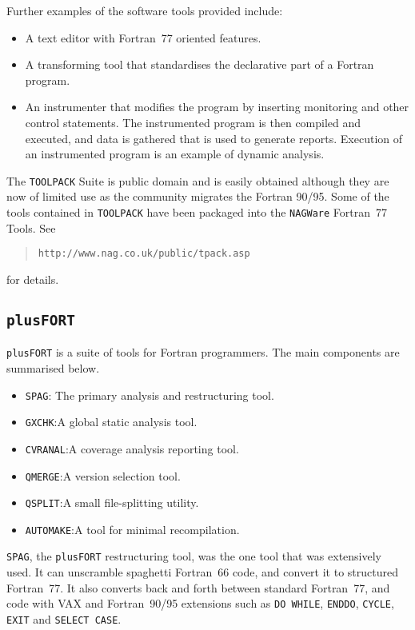 \documentclass[a4paper,titlepage,11pt]{article}
\begin{document}
Further examples of the software tools provided include:
\begin{itemize}
\item A text editor with Fortran~77 oriented features.
\item A transforming tool that standardises the declarative part of a Fortran program.
\item An instrumenter that modifies the program by inserting monitoring and other control statements. The instrumented program is then compiled and executed, and data is gathered that is used to generate reports. Execution of an instrumented program is an example of dynamic analysis. 
\end{itemize}
The {\tt TOOLPACK} Suite is public domain and is easily obtained although they are
now of limited use as the community migrates the Fortran 90/95. Some of the tools
contained in {\tt TOOLPACK} have been packaged into the {\tt NAGWare} Fortran~77 Tools.
See 
\begin{quote}
{\tt http://www.nag.co.uk/public/tpack.asp}
\end{quote}
for details.

\subsection{{\tt plusFORT}}

{\tt plusFORT} is a suite of tools for Fortran programmers. The main components are summarised below.

\begin{itemize}
			\item {\tt SPAG}: The primary analysis and restructuring tool.
			\item {\tt GXCHK}:A global static analysis tool.
			\item {\tt CVRANAL}:A coverage analysis reporting tool.
			\item {\tt QMERGE}:A version selection tool.
			\item {\tt QSPLIT}:A small file-splitting utility.
			\item {\tt AUTOMAKE}:A tool for minimal recompilation.
\end{itemize}

{\tt SPAG}, the {\tt plusFORT} restructuring tool, was the one tool that was extensively used. It can unscramble spaghetti Fortran~66 code, and convert it to structured Fortran~77. It also converts back and forth between standard Fortran~77, and code with VAX and Fortran~90/95 extensions such as {\tt DO WHILE}, {\tt ENDDO}, {\tt CYCLE}, {\tt EXIT} and {\tt SELECT CASE}.
\end{document}
